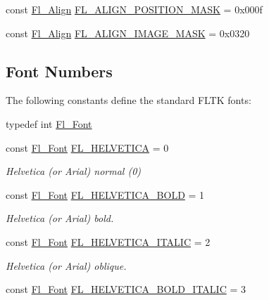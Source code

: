 \begin{DoxyCompactItemize}
\item 
const \hyperlink{_enumerations_8_h_a44e8bcd1e030e65e4f88cbae64a7c3e3}{Fl\+\_\+\+Align} \hyperlink{_enumerations_8_h_adf741c89d6b1599ac9813aa16d8730f5}{F\+L\+\_\+\+A\+L\+I\+G\+N\+\_\+\+P\+O\+S\+I\+T\+I\+O\+N\+\_\+\+M\+A\+SK} = 0x000f
\item 
const \hyperlink{_enumerations_8_h_a44e8bcd1e030e65e4f88cbae64a7c3e3}{Fl\+\_\+\+Align} \hyperlink{_enumerations_8_h_af50ce650b88c5fc3e3fd0ef02f99fb76}{F\+L\+\_\+\+A\+L\+I\+G\+N\+\_\+\+I\+M\+A\+G\+E\+\_\+\+M\+A\+SK} = 0x0320
\end{DoxyCompactItemize}
\subsection*{Font Numbers}
\label{_amgrpdeb92d65d2ffc09e02e05f1ef026f7d5}%
The following constants define the standard F\+L\+TK fonts\+: \begin{DoxyCompactItemize}
\item 
typedef int \hyperlink{_enumerations_8_h_a2ac46d9f082834b969fffe490a03a709}{Fl\+\_\+\+Font}
\item 
const \hyperlink{_enumerations_8_h_a2ac46d9f082834b969fffe490a03a709}{Fl\+\_\+\+Font} \hyperlink{_enumerations_8_h_a74d2c443f7ab53a6ce5d4ca0c7461bc9}{F\+L\+\_\+\+H\+E\+L\+V\+E\+T\+I\+CA} = 0
\begin{DoxyCompactList}\small\item\em Helvetica (or Arial) normal (0) \end{DoxyCompactList}\item 
const \hyperlink{_enumerations_8_h_a2ac46d9f082834b969fffe490a03a709}{Fl\+\_\+\+Font} \hyperlink{_enumerations_8_h_ae52b5d98292bf142ea1c7468d7d732cd}{F\+L\+\_\+\+H\+E\+L\+V\+E\+T\+I\+C\+A\+\_\+\+B\+O\+LD} = 1
\begin{DoxyCompactList}\small\item\em Helvetica (or Arial) bold. \end{DoxyCompactList}\item 
const \hyperlink{_enumerations_8_h_a2ac46d9f082834b969fffe490a03a709}{Fl\+\_\+\+Font} \hyperlink{_enumerations_8_h_a384a459d931aaf8140cd84034a5887dd}{F\+L\+\_\+\+H\+E\+L\+V\+E\+T\+I\+C\+A\+\_\+\+I\+T\+A\+L\+IC} = 2
\begin{DoxyCompactList}\small\item\em Helvetica (or Arial) oblique. \end{DoxyCompactList}\item 
const \hyperlink{_enumerations_8_h_a2ac46d9f082834b969fffe490a03a709}{Fl\+\_\+\+Font} \hyperlink{_enumerations_8_h_a925bd586f4c991776b48827818c16707}{F\+L\+\_\+\+H\+E\+L\+V\+E\+T\+I\+C\+A\+\_\+\+B\+O\+L\+D\+\_\+\+I\+T\+A\+L\+IC} = 3

\end{DoxyCompactItemize}
